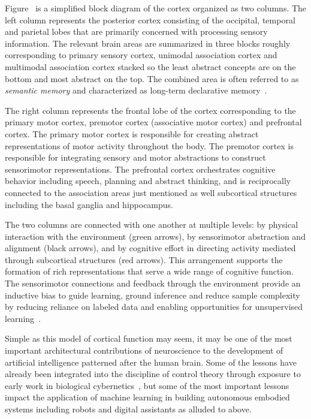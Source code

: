 Figure~{} is a simplified block diagram of the cortex organized as two columns. The left column represents the posterior cortex consisting of the occipital, temporal and parietal lobes that are primarily concerned with processing sensory information. The relevant brain areas are summarized in three blocks roughly corresponding to primary sensory cortex, unimodal association cortex and multimodal association cortex stacked so the least abstract concepts are on the bottom and most abstract on the top. The combined area is often referred to as {\it{semantic memory}} and characterized as long-term declarative memory~\cite{BinderandDesaiTiCS-11}. 

The right column represents the frontal lobe of the cortex corresponding to the primary motor cortex, premotor cortex (associative motor cortex) and prefrontal cortex. The primary motor cortex is responsible for creating abstract representations of motor activity throughout the body. The premotor cortex is responsible for integrating sensory and motor abstractions to construct sensorimotor representations. The prefrontal cortex orchestrates cognitive behavior including speech, planning and abstract thinking, and is reciprocally connected to the association areas just mentioned as well subcortical structures including the basal ganglia and hippocampus.

The two columns are connected with one another at multiple levels: by physical interaction with the environment (green arrows), by sensorimotor abstraction and alignment (black arrows), and by cognitive effort in directing activity mediated through subcortical structures (red arrows). This arrangement supports the formation of rich representations that serve a wide range of cognitive function. The sensorimotor connections and feedback through the environment provide an inductive bias to guide learning, ground inference and reduce sample complexity by reducing reliance on labeled data and enabling opportunities for unsupervised learning~\cite{BarlowNC-89}.

Simple as this model of cortical function may seem, it may be one of the most important architectural contributions of neuroscience to the development of artificial intelligence patterned after the human brain. Some of the lessons have already been integrated into the discipline of control theory through exposure to early work in biological cybernetics~\cite{FukushimaBC-80,Lettvinetal59,Jackson1958selected,GibsonPERCEPTION-50,McCullochandPitts43,vonUexk1926theoretical}, but some of the most important lessons impact the application of machine learning in building autonomous embodied systems including robots and digital assistants as alluded to above. 

